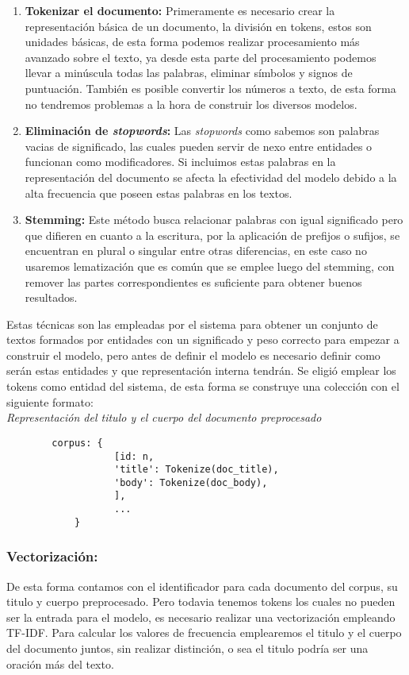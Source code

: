 \documentclass[runningheads,a4paper]{llncs}
\begin{document}
\begin{enumerate}
	\item \textbf{Tokenizar el documento:} Primeramente es necesario crear la representación básica de un documento, la división en tokens, estos son unidades básicas, de esta forma podemos realizar procesamiento más avanzado sobre el texto, ya desde esta parte del procesamiento podemos llevar a minúscula todas las palabras, eliminar símbolos y signos de puntuación. También es posible convertir los números a texto, de esta forma no tendremos problemas a la hora de construir los diversos modelos. \\
	\item \textbf{Eliminación de \textit{stopwords}:} Las \textit{stopwords} como sabemos son palabras vacias de significado, las cuales pueden servir de nexo entre entidades o funcionan como modificadores. Si incluimos estas palabras en la representación del documento se afecta la efectividad del modelo debido a la alta frecuencia que poseen estas palabras en los textos. \\
	\item \textbf{Stemming:} Este método busca relacionar palabras con igual significado
	pero que difieren en cuanto a la escritura, por la aplicación de prefijos o
	sufijos, se encuentran en plural o singular entre otras diferencias, en este caso no usaremos lematización que es común que se emplee luego del stemming, con remover las partes correspondientes es suficiente para obtener buenos resultados.
\end{enumerate} 

Estas técnicas son las empleadas por el sistema para obtener un conjunto de textos formados por entidades con un significado y peso correcto para empezar a construir el modelo, pero antes de definir el modelo es necesario definir como serán estas entidades y que representación interna tendrán. Se eligió emplear los tokens como entidad del sistema, de esta forma se construye una colección con el siguiente formato:  \\

\noindent
{\it Representación del titulo y el cuerpo del documento preprocesado}
\begin{verbatim}
	    corpus: {
                   [id: n,
                   'title': Tokenize(doc_title),
                   'body': Tokenize(doc_body),
                   ],
                   ...
            }
\end{verbatim}
%
\noindent

\subsubsection{Vectorización:} De esta forma contamos con el identificador para cada documento del corpus, su titulo y cuerpo preprocesado. Pero todavia tenemos tokens los cuales no pueden ser la entrada para el modelo, es necesario realizar una vectorización
empleando TF-IDF. Para calcular los valores de frecuencia emplearemos el titulo y el cuerpo del documento juntos, sin realizar distinción, o sea el titulo podría ser una oración más del texto.
\end{document}
